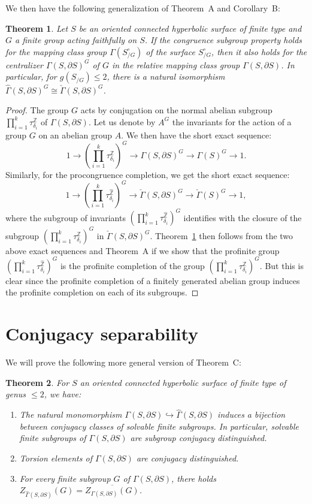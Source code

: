 \documentclass[12pt,twoside]{amsart}
\newtheorem{theorem}{Theorem}[section]
\theoremstyle{definition}
\newcommand{\Z}{\mathbb{Z}}
\newcommand{\ZZ}{{\widehat{\mathbb Z}}}
\def\dd{\partial}
\def\G{{\Gamma}}
\def\kG{{\check\Gamma}}
\def\hG{{\widehat\Gamma}}
\def\d{{\delta}}
\def\ol{\overline}
\def\hookra{\hookrightarrow}
\begin{document}
We then have the following generalization of Theorem~A and Corollary~B:

\begin{theorem}\label{congrel}Let $S$ be an oriented connected hyperbolic surface of finite type and $G$ a finite group acting faithfully on $S$.
If the congruence subgroup property holds for the mapping class group $\G(S_{/G}^\circ)$ of the surface $S_{/G}^\circ$, 
then it also holds for the centralizer $\G(S,\dd S)^G$ of $G$ in the relative mapping class group $\G(S,\dd S)$. 
In particular, for $g(S_{/G})\leq 2$, there is a natural isomorphism $\hG(S,\dd S)^G\cong\kG(S,\dd S)^G$.
\end{theorem}

\begin{proof}The group $G$ acts by conjugation on the normal abelian subgroup $\prod_{i=1}^k\tau_{\d_i}^\Z$ of $\G(S,\dd S)$.
Let us denote by $A^G$ the invariants for the action of a group $G$ on an abelian group $A$. We then have the short exact sequence:
\[1\to(\prod_{i=1}^k\tau_{\d_i}^\Z)^G\to\G(S,\dd S)^G\to\G(S)^G\to 1.\]
Similarly, for the procongruence completion, we get the short exact sequence:
\[1\to(\prod_{i=1}^k\tau_{\d_i}^\ZZ)^G\to\kG(S,\dd S)^G\to\kG(S)^G\to 1,\]
where the subgroup of invariants $(\prod_{i=1}^k\tau_{\d_i}^\ZZ)^G$ identifies with the closure of the subgroup $(\prod_{i=1}^k\tau_{\d_i}^\Z)^G$
in $\kG(S,\dd S)^G$. Theorem~\ref{congrel} then follows from the two above exact sequences and Theorem~A if we show that the profinite group 
$(\prod_{i=1}^k\tau_{\d_i}^\ZZ)^G$ is the profinite completion of the group $(\prod_{i=1}^k\tau_{\d_i}^\Z)^G$. But this is clear 
since the profinite completion of a finitely generated abelian group induces the profinite completion on each of its subgroups.
\end{proof}



\section{Conjugacy separability}
We will prove the following more general version of Theorem~C:

\begin{theorem}\label{torsionrelative}For $S$ an oriented connected hyperbolic surface of finite type of genus $\leq 2$, we have:
\begin{enumerate}
\item The natural monomorphism $\G(S,\dd S)\hookra\hG(S,\dd S)$ induces a bijection between conjugacy classes
of solvable finite subgroups. In particular, solvable finite subgroups of $\G(S,\dd S)$ are subgroup conjugacy distinguished. 
\item Torsion elements of $\G(S,\dd S)$ are conjugacy distinguished.
\item For every finite subgroup $G$ of $\G(S,\dd S)$, there holds $Z_{\hG(S,\dd S)}(G)=\ol{Z_{\G(S,\dd S)}(G)}$.\\ 
\end{enumerate}
\end{theorem}
\end{document}
